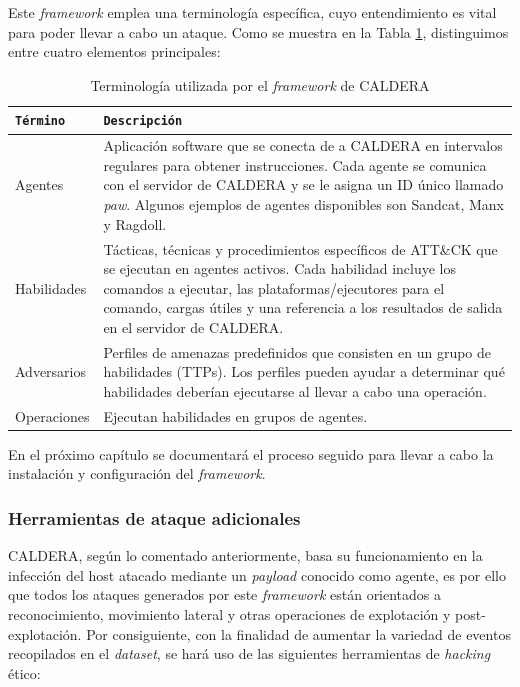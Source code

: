 Este \textit{framework} emplea una terminología específica, cuyo entendimiento es vital para poder llevar a cabo un ataque. Como se muestra en la Tabla \ref{tab:caldera-terminologia}, distinguimos entre cuatro elementos principales:

\begin{table}[h]
\centering
\footnotesize
\begin{tabularx}{\linewidth}{|l|X|}
\hline
\rowcolor{graylight}\texttt{Término} & \texttt{Descripción} \\
\hline
Agentes & Aplicación software que se conecta de a CALDERA en intervalos regulares para obtener instrucciones. Cada agente se comunica con el servidor de CALDERA y se le asigna un ID único llamado \textit{paw}. Algunos ejemplos de agentes disponibles son Sandcat, Manx y Ragdoll. \\
\hline
Habilidades & Tácticas, técnicas y procedimientos específicos de ATT\&CK que se ejecutan en agentes activos. Cada habilidad incluye los comandos a ejecutar, las plataformas/ejecutores para el comando, cargas útiles y una referencia a los resultados de salida en el servidor de CALDERA. \\
\hline
Adversarios & Perfiles de amenazas predefinidos que consisten en un grupo de habilidades (\gls{TTP}s). Los perfiles pueden ayudar a determinar qué habilidades deberían ejecutarse al llevar a cabo una operación. \\
\hline
Operaciones & Ejecutan habilidades en grupos de agentes. \\
\hline
\end{tabularx}
\caption{Terminología utilizada por el \textit{framework} de \gls{CALDERA}}
\label{tab:caldera-terminologia}
\end{table}

En el próximo capítulo se documentará el proceso seguido para llevar a cabo la instalación y configuración del \textit{framework}.

\subsubsection*{Herramientas de ataque adicionales} \label{adicional-tools}

\gls{CALDERA}, según lo comentado anteriormente, basa su funcionamiento en la infección del host atacado mediante un \textit{payload} conocido como agente, es por ello que todos los ataques generados por este \textit{framework} están orientados a reconocimiento, movimiento lateral y otras operaciones de explotación y post-explotación. Por consiguiente, con la finalidad de aumentar la variedad de eventos recopilados en el \textit{dataset}, se hará uso de las siguientes herramientas de \textit{hacking} ético:


